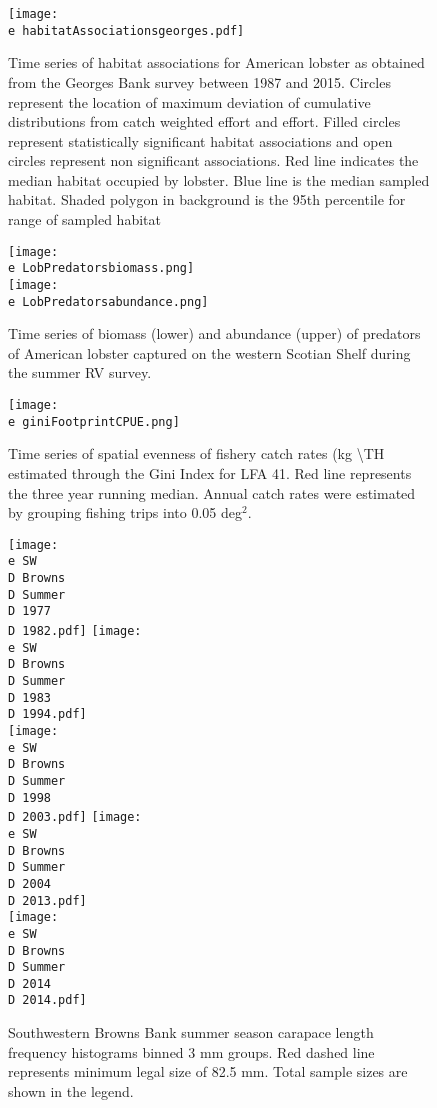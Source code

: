 \documentclass[11pt]{article}
\newcommand{\D}{.}
\newcommand{\e}{/backup/bio_data/bio.lobster/figures/} %
\begin{document}
\begin{figure}

    \texttt{[image: \\e habitatAssociationsgeorges.pdf]}
    \caption{Time series of habitat associations for American lobster as obtained from the Georges Bank survey between 1987 and 2015. Circles represent the location of maximum deviation of cumulative distributions from catch weighted effort and effort. Filled circles represent statistically significant habitat associations and open circles represent non significant associations. Red line indicates the median habitat occupied by lobster. Blue line is the median sampled habitat. Shaded polygon in background is the 95th percentile for range of sampled habitat}

\end{figure}





\begin{figure}
\centering
    \texttt{[image: \\e LobPredatorsbiomass.png]}\\
    \texttt{[image: \\e LobPredatorsabundance.png]}\\
    \caption{Time series of biomass (lower) and abundance (upper) of predators of American lobster captured on the western Scotian Shelf during the summer RV survey.}

\end{figure}




\begin{figure}

    \texttt{[image: \\e giniFootprintCPUE.png]}
    \caption{Time series of spatial evenness of fishery catch rates (kg \textbackslash TH estimated through the Gini Index for LFA 41. Red line represents the three year running median. Annual catch rates were estimated by grouping fishing trips into 0.05 deg$^2$.}

\end{figure}




\begin{figure}
\centering
    \texttt{[image: \\e SW\\D Browns\\D Summer\\D 1977\\D 1982.pdf]}
    \texttt{[image: \\e SW\\D Browns\\D Summer\\D 1983\\D 1994.pdf]}\\
    \texttt{[image: \\e SW\\D Browns\\D Summer\\D 1998\\D 2003.pdf]}
    \texttt{[image: \\e SW\\D Browns\\D Summer\\D 2004\\D 2013.pdf]}\\
    \texttt{[image: \\e SW\\D Browns\\D Summer\\D 2014\\D 2014.pdf]}
    
    \caption{Southwestern Browns Bank summer season carapace length frequency histograms binned 3 mm groups. Red dashed line represents minimum legal size of 82.5 mm. Total sample sizes are shown in the legend.}

\end{figure}
\end{document}
